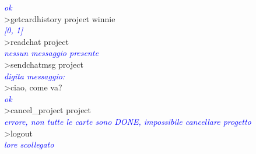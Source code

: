 \documentclass{article} %
\begin{document}
\textcolor{blue}{{\itshape ok}} \\
>getcardhistory project winnie \\
\textcolor{blue}{{\itshape [0, 1]}} \\
>readchat project \\
\textcolor{blue}{{\itshape nessun messaggio presente}} \\
>sendchatmsg project \\
\textcolor{blue}{{\itshape digita messaggio: }} \\
>ciao, come va? \\
\textcolor{blue}{{\itshape ok}} \\
>cancel\_project project \\
\textcolor{blue}{{\itshape errore, non tutte le carte sono DONE, impossibile cancellare progetto}} \\
>logout \\
\textcolor{blue}{{\itshape lore scollegato}} \\
\end{document}
